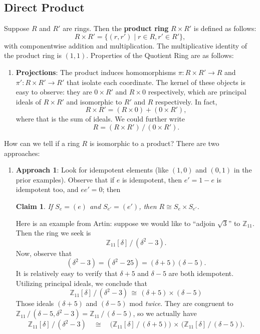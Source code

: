 \documentclass[11pt]{article}
\newtheorem{claim}{Claim}
\begin{document}

\subsection{Direct Product}

Suppose $R$ and $R'$ are rings. Then the \textbf{product ring} $R \times R'$ is defined as follows:
\[
  R \times R' = \{ (r, r') \mid r \in R, r' \in R' \},
\]
with componentwise addition and multiplication. The multiplicative identity of the product ring is $(1, 1)$. Properties of the Quotient Ring are as follows:
\begin{enumerate}
  \item \textbf{Projections}: The product induces homomorphisms $\pi : R \times R' \to R$ and $\pi' : R \times R' \to R'$ that isolate each coordinate. The kernel of these objects is easy to observe: they are $0 \times R'$ and $R \times 0$ respectively, which are principal ideals of $R \times R'$ and isomorphic to $R'$ and $R$ respectively. In fact,
  \[
    R \times R' = (R \times 0) + (0 \times R'),
  \]
  where that is the sum of ideals. We could further write
  \[
    R = (R \times R') \,/\, (0 \times R').
  \]
\end{enumerate}

 How can we tell if a ring $R$ is isomorphic to a product? There are two approaches:
 \begin{enumerate}
   \item \textbf{Approach 1}: Look for idempotent elements (like $(1, 0)$ and $(0, 1)$ in the prior examples). Observe that if $e$ is idempotent, then $e' = 1 - e$ is idempotent too, and $ee' = 0$; then
   \begin{adjustwidth}{0.5cm}{}
     \begin{claim}
       If $S_{e} = (e)$ and $S_{e'} = (e')$, then $R \cong S_{e} \times S_{e'}$.
     \end{claim}
   \end{adjustwidth}
   Here is an example from Artin: suppose we would like to ``adjoin $\sqrt{3}$'' to $\mathbb{Z}_{11}$. Then the ring we seek is
   \[
     \mathbb{Z}_{11}[\delta] \,/\, (\delta^{2} - 3).
   \]
   Now, observe that
   \[
     (\delta^{2} - 3) = (\delta^{2} - 25) = (\delta + 5)(\delta - 5).
   \]
   It is relatively easy to verify that $\delta + 5$ and $\delta - 5$ are both idempotent. Utilizing principal ideals, we conclude that
   \[
     \mathbb{Z}_{11}[\delta] \,/\, (\delta^{2} - 3) \, \cong \, (\delta + 5) \times (\delta - 5)
   \]
   Those ideals $(\delta + 5)$ and $(\delta - 5)$ mod \textit{twice}. They are congruent to $\mathbb{Z}_{11} \,/\, (\delta - 5, \delta^{2} - 3) = \mathbb{Z}_{11} \,/\, (\delta - 5)$, so we actually have
   \[
     \mathbb{Z}_{11}[\delta] \,/\, (\delta^{2} - 3) \quad \cong \quad \Big( \mathbb{Z}_{11}[\delta] \,/\, (\delta + 5) \Big) \, \times \, \Big( \mathbb{Z}_{11}[\delta] \,/\, (\delta - 5) \Big).
   \]
 \end{enumerate}
\end{document}

